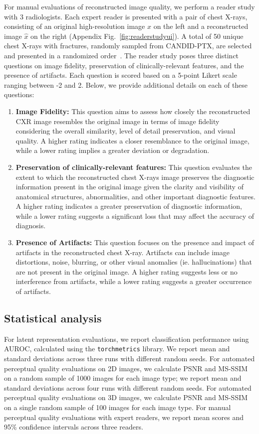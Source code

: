 For manual evaluations of reconstructed image quality, we perform a reader study with 3 radiologists. Each expert reader is presented with a pair of chest X-rays, consisting of an original high-resolution image $x$ on the left and a reconstructed image $\hat{x}$ on the right (Appendix Fig.~\ref{fig:readerstudyui}). A total of 50 unique chest X-rays with fractures, randomly sampled from CANDID-PTX, are selected and presented in a randomized order~\cite{feng2021candid}. The reader study poses three distinct questions on image fidelity, preservation of clinically-relevant features, and the presence of artifacts. Each question is scored based on a 5-point Likert scale ranging between -2 and 2. Below, we provide additional details on each of these questions: 
\begin{enumerate}
    \item \textbf{Image Fidelity:} This question aims to assess how closely the reconstructed CXR image resembles the original image in terms of image fidelity considering the overall similarity, level of detail preservation, and visual quality. A higher rating indicates a closer resemblance to the original image, while a lower rating implies a greater deviation or degradation.
    \item \textbf{Preservation of clinically-relevant features:} This question evaluates the extent to which the reconstructed chest X-rays image preserves the diagnostic information present in the original image given the clarity and visibility of anatomical structures, abnormalities, and other important diagnostic features. A higher rating indicates a greater preservation of diagnostic information, while a lower rating suggests a significant loss that may affect the accuracy of diagnosis.
    \item \textbf{Presence of Artifacts:} This question focuses on the presence and impact of artifacts in the reconstructed chest X-ray. Artifacts can include image distortions, noise, blurring, or other visual anomalies (ie. hallucinations) that are not present in the original image. A higher rating suggests less or no interference from artifacts, while a lower rating suggests a greater occurrence of artifacts.
\end{enumerate}


\subsection{Statistical analysis}
For latent representation evaluations, we report classification performance using AUROC, calculated using the \texttt{torchmetrics} library. We report mean and standard deviations across three runs with different random seeds. For automated perceptual quality evaluations on 2D images, we calculate PSNR and MS-SSIM on a random sample of 1000 images for each image type; we report mean and standard deviations across four runs with different random seeds. For automated perceptual quality evaluations on 3D images, we calculate PSNR and MS-SSIM on a single random sample of 100 images for each image type. For manual perceptual quality evaluations with expert readers, we report mean scores and 95\% confidence intervals across three readers.




